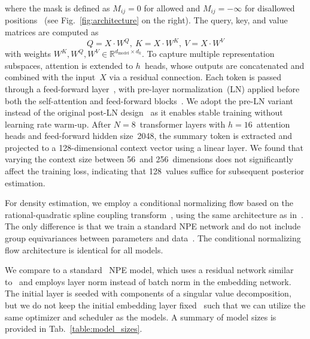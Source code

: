 where the mask is defined as $M_{ij} = 0$ for allowed and $M_{ij} = - \infty$ for disallowed positions~\citep{vaswani:2017, cheng_mask2former:2021} (see Fig.~\ref{fig:architecture} on the right). 
The query, key, and value matrices are computed as
\begin{equation}
    Q = X \cdot W^Q,~ K = X \cdot W^K,~ V = X \cdot W^V 
\end{equation} 
with weights $W^K, W^Q, W^V \in \mathbb{R}^{d_\mathrm{model} \times d_k}$.
To capture multiple representation subspaces, attention is extended to $h$~heads, whose outputs are concatenated and combined with the input~$X$ via a residual connection. 
Each token is passed through a feed-forward layer~\citep{vaswani:2017}, with pre-layer normalization~(LN) applied before both the self-attention and feed-forward blocks~\citep{wang:2019, xiong:2020}. 
We adopt the pre-LN variant instead of the original post-LN design~\citep{vaswani:2017} as it enables stable training without learning rate warm-up. 
After $N=8$~transformer layers with $h=16$~attention heads and feed-forward hidden size~2048, the summary token is extracted and projected to a 128-dimensional context vector using a linear layer. 
We found that varying the context size between 56~and 256~dimensions does not significantly affect the training loss, indicating that 128~values suffice for subsequent posterior estimation.

For density estimation, we employ a conditional normalizing flow based on the rational-quadratic spline coupling transform~\citep{durkan_nsf:2019}, using the same architecture as in~\citep{dax_is:2022}. 
The only difference is that we train a standard NPE network and do not include group equivariances between parameters and data~\citep{dax_gnpe:2021}.
The conditional normalizing flow architecture is identical for all models.

We compare \dingoT to a standard \dingo~NPE model, which uses a residual network similar to~\citep{dax_dingo:2021} and employs layer norm instead of batch norm in the embedding network. 
The initial layer is seeded with components of a singular value decomposition, but we do not keep the initial embedding layer fixed~\citep{dax_dingo:2021} such that we can utilize the same optimizer and scheduler as the \dingoT models. 
A summary of model sizes is provided in Tab.~\ref{table:model_sizes}.

